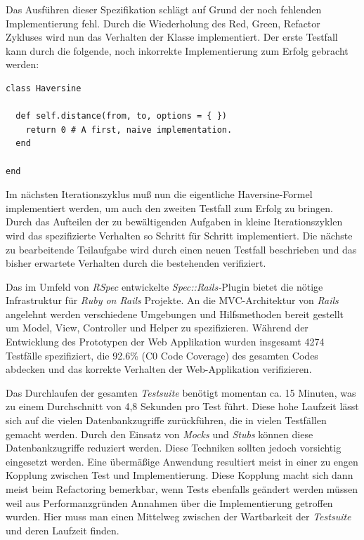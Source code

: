 Das Ausführen dieser Spezifikation schlägt auf Grund der noch
fehlenden Implementierung fehl. Durch die Wiederholung des Red, Green,
Refactor Zykluses wird nun das Verhalten der Klasse implementiert. Der
erste Testfall kann durch die folgende, noch inkorrekte
Implementierung zum Erfolg gebracht werden:

\begin{lstlisting}[float=t]
class Haversine

  def self.distance(from, to, options = { })
    return 0 # A first, naive implementation.
  end

end
\end{lstlisting}

Im nächsten Iterationszyklus muß nun die eigentliche Haversine-Formel
\cite{wiki:haversine} implementiert werden, um auch den zweiten
Testfall zum Erfolg zu bringen. Durch das Aufteilen der zu
bewältigenden Aufgaben in kleine Iterationszyklen wird das
spezifizierte Verhalten so Schritt für Schritt implementiert. Die
nächste zu bearbeitende Teilaufgabe wird durch einen neuen Testfall
beschrieben und das bisher erwartete Verhalten durch die bestehenden
verifiziert.

Das im Umfeld von \textit{RSpec} entwickelte
\textit{Spec::Rails-}Plugin bietet die nötige Infrastruktur für
\textit{Ruby on Rails} Projekte. An die MVC-Architektur von
\textit{Rails} angelehnt werden verschiedene Umgebungen und
Hilfsmethoden bereit gestellt um Model, View, Controller und Helper zu
spezifizieren. Während der Entwicklung des Prototypen der Web
Applikation wurden insgesamt 4274 Testfälle spezifiziert, die 92.6\%
(C0 Code Coverage) des gesamten Codes abdecken und das korrekte
Verhalten der Web-Applikation verifizieren.

Das Durchlaufen der gesamten \textit{Testsuite} benötigt momentan
ca. 15 Minuten, was zu einem Durchschnitt von 4,8 Sekunden pro Test
führt. Diese hohe Laufzeit lässt sich auf die vielen Datenbankzugriffe
zurückführen, die in vielen Testfällen gemacht werden. Durch den
Einsatz von \textit{Mocks} und \textit{Stubs} können diese
Datenbankzugriffe reduziert werden. Diese Techniken sollten jedoch
vorsichtig eingesetzt werden. Eine übermäßige Anwendung resultiert
meist in einer zu engen Kopplung zwischen Test und
Implementierung. Diese Kopplung macht sich dann meist beim Refactoring
bemerkbar, wenn Tests ebenfalls geändert werden müssen weil aus
Performanzgründen Annahmen über die Implementierung getroffen
wurden. Hier muss man einen Mittelweg zwischen der Wartbarkeit der
\textit{Testsuite} und deren Laufzeit finden.

